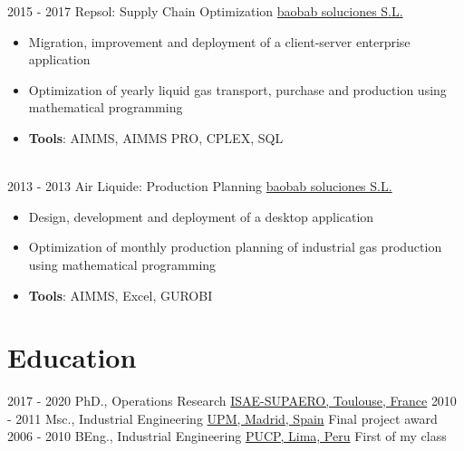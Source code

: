 \documentclass[letterpaper]{twentysecondcv} %
\begin{document}
\begin{twenty}
  \twentyitem
      {2015 - 2017 }
    {}
        {Repsol: Supply Chain Optimization}
        {\href{https://baobabsoluciones.es/en/}{baobab soluciones S.L.}}
        {}
        {
        {\begin{itemize}
        \item Migration, improvement and deployment of a client-server enterprise application
        \item Optimization of yearly liquid gas transport, purchase and production using mathematical programming
        \item \textbf{Tools}: AIMMS, AIMMS PRO, CPLEX, SQL
        \vspace{2mm}
        \end{itemize}}
        }
  \\
  \twentyitem
      {2013 - 2013 }
    {}
        {Air Liquide: Production Planning}
        {\href{https://baobabsoluciones.es/en/}{baobab soluciones S.L.}}
        {}
        {
        {\begin{itemize}
        \item Design, development and deployment of a desktop application
        \item Optimization of monthly production planning of industrial gas production using mathematical programming
        \item \textbf{Tools}: AIMMS, Excel, GUROBI
        \vspace{2mm}
        \end{itemize}}
        }
\end{twenty}
\vspace{-0.5cm}
\section{Education}

\begin{twenty} %
  \twentyitemshorttest
      {2017 - 2020}
        {}
        {PhD., Operations Research}
        {\href{https://www.isae-supaero.fr/en/}{ISAE-SUPAERO, Toulouse, France}}
        {}   
  \twentyitemshorttest
      {2010 - 2011}
    {}
        {Msc., Industrial Engineering}
        {\href{https://www.upm.es/internacional}{UPM, Madrid, Spain}}
        {Final project award}
  \twentyitemshorttest
      {2006 - 2010}
    {}
        {BEng., Industrial Engineering}
        {\href{https://www.pucp.edu.pe/}{PUCP, Lima, Peru}}
        {First of my class}
\end{twenty}
\end{document}
